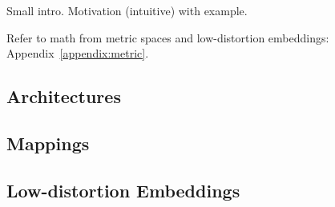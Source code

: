 Small intro. Motivation (intuitive) with example. \blindtext[4]

Refer to math from metric spaces and low-distortion embeddings: Appendix~\ref{appendix:metric}.


\subsection{Architectures}
\Blindtext[5]

\subsection{Mappings}
\Blindtext[5]

\subsection{Low-distortion Embeddings}
\Blindtext[5] %